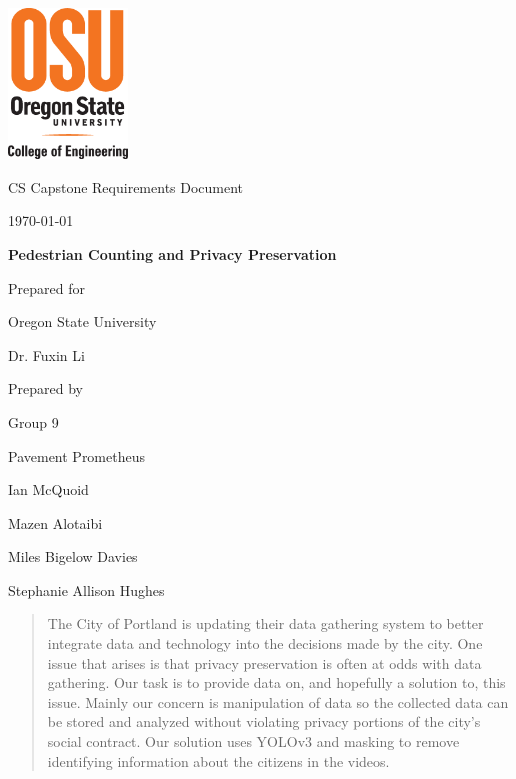 \documentclass[onecolumn, draftclsnofoot,10pt, compsoc]{IEEEtran}
\def \CapstoneTeamName{		Pavement Prometheus}
\def \CapstoneTeamNumber{		9}
\def \GroupMemberOne{			Ian McQuoid  }
\def \GroupMemberTwo{			Mazen Alotaibi }
\def \GroupMemberThree{			Miles Bigelow Davies  }
\def \GroupMemberFour{			Stephanie Allison Hughes }
\def \CapstoneProjectName{		Pedestrian Counting and Privacy Preservation}
\def \CapstoneSponsorCompany{	Oregon State University}
\def \CapstoneSponsorPerson{		Dr. Fuxin Li}
\def \DocType{		%
				Requirements Document
				}
\newcommand{\NameSigPair}[1]{\par
\makebox[2.75in][r]{#1} \hfil 	\makebox[3.25in]{\makebox[2.25in]{\hrulefill} \hfill		\makebox[.75in]{\hrulefill}}
\par\vspace{-12pt} \textit{\tiny\noindent
\makebox[2.75in]{} \hfil		\makebox[3.25in]{\makebox[2.25in][r]{Signature} \hfill	\makebox[.75in][r]{Date}}}}
\renewcommand{\NameSigPair}[1]{#1}
\begin{document}
\begin{titlepage}
    \begin{singlespace}
    	\includegraphics[height=4cm]{coe_v_spot1}
        \hfill 
        \par\vspace{.2in}
        \centering
        \scshape{
            \huge CS Capstone \DocType \par
            {\large\today}\par
            \vspace{.5in}
            \textbf{\Huge\CapstoneProjectName}\par
            {\large Prepared for}\par
            \Huge \CapstoneSponsorCompany\par
            \vspace{5pt}
            {\Large\NameSigPair{\CapstoneSponsorPerson}\par}
            {\large Prepared by }\par
            Group\CapstoneTeamNumber\par
            \CapstoneTeamName\par 
            \vspace{5pt}
            {\Large
                \NameSigPair{\GroupMemberOne}\par
                \NameSigPair{\GroupMemberTwo}\par
                \NameSigPair{\GroupMemberThree}\par
                \NameSigPair{\GroupMemberFour}\par
            }
            \vspace{20pt}
        }
        \begin{abstract}
        The City of Portland is updating their data gathering system to better integrate data and technology into the decisions made by the city. One issue that arises is that privacy preservation is often at odds with data gathering. Our task is to provide data on, and hopefully a solution to, this issue. Mainly our concern is manipulation of data so the collected data can be stored and analyzed without violating privacy portions of the city's social contract. Our solution uses YOLOv3 and masking to remove identifying information about the citizens in the videos.
        \end{abstract}     
    \end{singlespace}
\end{titlepage}
\end{document}
